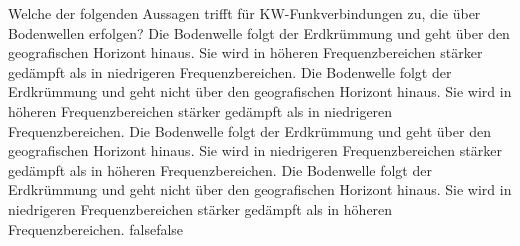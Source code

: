     {Welche der folgenden Aussagen trifft für KW-Funkverbindungen zu, die über Bodenwellen erfolgen?}
    {Die Bodenwelle folgt der Erdkrümmung und geht über den geografischen Horizont hinaus. Sie wird in höheren Frequenzbereichen stärker gedämpft als in niedrigeren Frequenzbereichen.}
    {Die Bodenwelle folgt der Erdkrümmung und geht nicht über den geografischen Horizont hinaus. Sie wird in höheren Frequenzbereichen stärker gedämpft als in niedrigeren Frequenzbereichen.}
    {Die Bodenwelle folgt der Erdkrümmung und geht über den geografischen Horizont hinaus. Sie wird in niedrigeren Frequenzbereichen stärker gedämpft als in höheren Frequenzbereichen.}
    {Die Bodenwelle folgt der Erdkrümmung und geht nicht über den geografischen Horizont hinaus. Sie wird in niedrigeren Frequenzbereichen stärker gedämpft als in höheren Frequenzbereichen.}
    {false}{false}